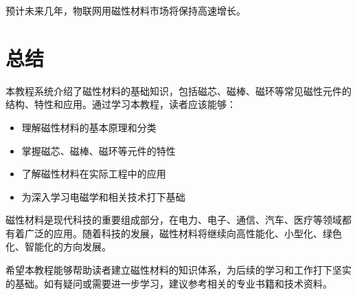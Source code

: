 \documentclass[12pt,UTF8]{ctexbook}
\begin{document}
预计未来几年，物联网用磁性材料市场将保持高速增长。

\backmatter

\chapter{总结}

本教程系统介绍了磁性材料的基础知识，包括磁芯、磁棒、磁环等常见磁性元件的结构、特性和应用。通过学习本教程，读者应该能够：

\begin{itemize}[leftmargin=2cm]
    \item 理解磁性材料的基本原理和分类
    \item 掌握磁芯、磁棒、磁环等元件的特性
    \item 了解磁性材料在实际工程中的应用
    \item 为深入学习电磁学和相关技术打下基础
\end{itemize}

磁性材料是现代科技的重要组成部分，在电力、电子、通信、汽车、医疗等领域都有着广泛的应用。随着科技的发展，磁性材料将继续向高性能化、小型化、绿色化、智能化的方向发展。

希望本教程能够帮助读者建立磁性材料的知识体系，为后续的学习和工作打下坚实的基础。如有疑问或需要进一步学习，建议参考相关的专业书籍和技术资料。
\end{document}
